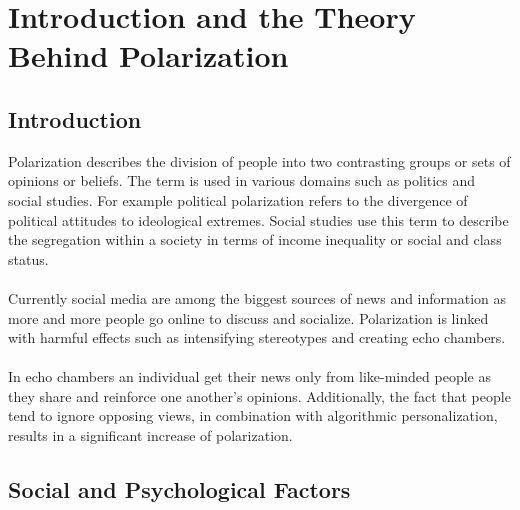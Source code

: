 \chapter{Introduction and the Theory Behind Polarization}
\label{ch:Introduction}


\section{Introduction}
\label{sec:Objectives}

Polarization describes the division of people into two contrasting groups or sets of opinions or beliefs. The term is used in various domains such as politics and social studies. For example political polarization refers to the divergence of political attitudes to ideological extremes. Social studies use this term to  describe the segregation within a society in terms of income inequality or social and class status.
\\
\\
Currently social media are among the biggest sources of news and information as more and more people go online to discuss and socialize. Polarization is linked with harmful effects such as intensifying stereotypes and creating echo chambers.
\\
\\
In echo chambers an individual get their news only from like-minded people as they share and reinforce one another’s opinions. Additionally, the fact that people tend to ignore opposing views, in combination with algorithmic personalization, results in a significant increase of polarization.

\section{Social and Psychological Factors}

